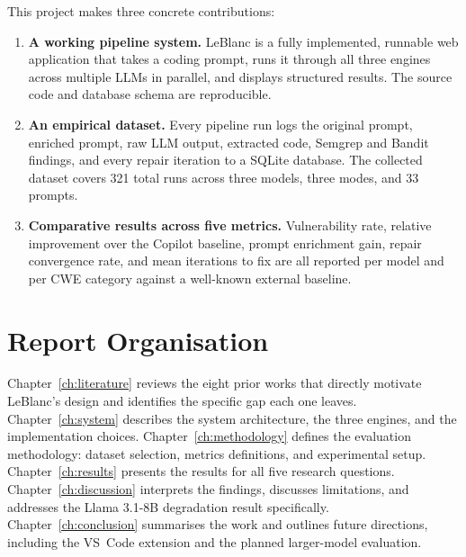 \documentclass[12pt,a4paper]{report}
\begin{document}
This project makes three concrete contributions:

\begin{enumerate}
  \item \textbf{A working pipeline system.} LeBlanc is a fully implemented,
        runnable web application that takes a coding prompt, runs it through all
        three engines across multiple LLMs in parallel, and displays structured
        results. The source code and database schema are reproducible.

  \item \textbf{An empirical dataset.} Every pipeline run logs the original
        prompt, enriched prompt, raw LLM output, extracted code, Semgrep and
        Bandit findings, and every repair iteration to a SQLite database. The
        collected dataset covers 321 total runs across three models, three modes,
        and 33 prompts.

  \item \textbf{Comparative results across five metrics.} Vulnerability rate,
        relative improvement over the Copilot baseline, prompt enrichment gain,
        repair convergence rate, and mean iterations to fix are all reported per
        model and per CWE category against a well-known external baseline.
\end{enumerate}

\section{Report Organisation}
\label{sec:organisation}

Chapter~\ref{ch:literature} reviews the eight prior works that directly motivate
LeBlanc's design and identifies the specific gap each one leaves.
Chapter~\ref{ch:system} describes the system architecture, the three engines, and
the implementation choices.
Chapter~\ref{ch:methodology} defines the evaluation methodology: dataset
selection, metrics definitions, and experimental setup.
Chapter~\ref{ch:results} presents the results for all five research questions.
Chapter~\ref{ch:discussion} interprets the findings, discusses limitations, and
addresses the Llama 3.1-8B degradation result specifically.
Chapter~\ref{ch:conclusion} summarises the work and outlines future directions,
including the VS~Code extension and the planned larger-model evaluation.

\end{document}

